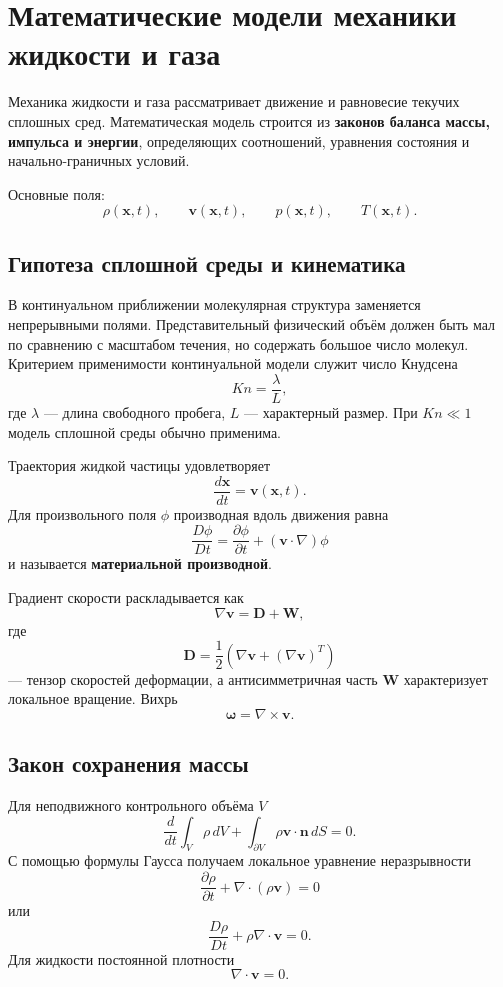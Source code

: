 \section{Математические модели механики жидкости и газа}
\label{sec:models-fluid-gas}

Механика жидкости и газа рассматривает движение и равновесие текучих
сплошных сред. Математическая модель строится из
\textbf{законов баланса массы, импульса и энергии}, определяющих
соотношений, уравнения состояния и начально-граничных условий.

Основные поля:
\[
\rho(\mathbf x,t),\qquad
\mathbf v(\mathbf x,t),\qquad
p(\mathbf x,t),\qquad
T(\mathbf x,t).
\]

\subsection{Гипотеза сплошной среды и кинематика}

В континуальном приближении молекулярная структура заменяется непрерывными
полями. Представительный физический объём должен быть мал по сравнению с
масштабом течения, но содержать большое число молекул. Критерием применимости
континуальной модели служит число Кнудсена
\[
Kn=\frac{\lambda}{L},
\]
где $\lambda$ --- длина свободного пробега, $L$ --- характерный размер. При
$Kn\ll1$ модель сплошной среды обычно применима.

Траектория жидкой частицы удовлетворяет
\[
\frac{d\mathbf x}{dt}=\mathbf v(\mathbf x,t).
\]
Для произвольного поля $\phi$ производная вдоль движения равна
\[
\boxed{
\frac{D\phi}{Dt}
=\frac{\partial\phi}{\partial t}
+(\mathbf v\cdot\nabla)\phi
}
\]
и называется \textbf{материальной производной}.

Градиент скорости раскладывается как
\[
\nabla\mathbf v=\mathbf D+\mathbf W,
\]
где
\[
\mathbf D=\frac12\left(\nabla\mathbf v+(\nabla\mathbf v)^T\right)
\]
--- тензор скоростей деформации, а антисимметричная часть $\mathbf W$
характеризует локальное вращение. Вихрь
\[
\boldsymbol\omega=\nabla\times\mathbf v.
\]

\subsection{Закон сохранения массы}

Для неподвижного контрольного объёма $V$
\[
\frac{d}{dt}\int_V\rho\,dV
+\int_{\partial V}\rho\mathbf v\cdot\mathbf n\,dS=0.
\]
С помощью формулы Гаусса получаем локальное уравнение неразрывности
\[
\boxed{
\frac{\partial\rho}{\partial t}
+\nabla\cdot(\rho\mathbf v)=0
}
\]
или
\[
\frac{D\rho}{Dt}+\rho\nabla\cdot\mathbf v=0.
\]
Для жидкости постоянной плотности
\[
\boxed{\nabla\cdot\mathbf v=0}.
\]

